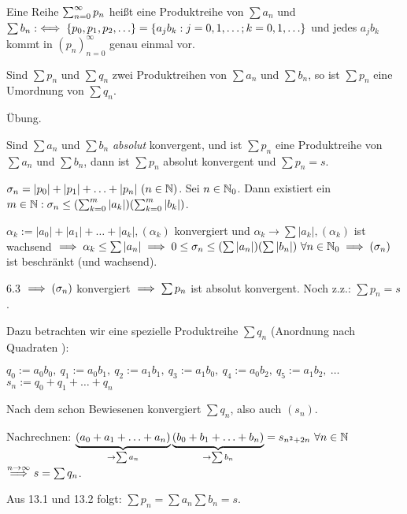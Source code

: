 \documentclass[a4paper,oneside,DIV15,BCOR12mm]{scrbook}
\begin{document}
\begin{definition}
Eine Reihe $\sum_{n=0}^{\infty}{p_n}$ heißt eine Produktreihe von $\sum{a_n}$ und $\sum{b_n} :\iff \{p_0,p_1,p_2,\ldots\} = \{a_j b_k: j=0,1,\ldots; k=0,1,\ldots\}$ und jedes $a_j b_k$ kommt in $(p_n)_{n=0}^{\infty}$ genau einmal vor.
\end{definition}

\begin{satz}
Sind $\sum{p_n}$ und $\sum{q_n}$ zwei Produktreihen von $\sum{a_n}$ und $\sum{b_n}$, so ist $\sum{p_n}$ eine Umordnung von $\sum{q_n}$.
\end{satz}

\begin{beweis}
Übung.
\end{beweis}

\begin{satz}
Sind $\sum{a_n}$ und $\sum{b_n}$ \emph{absolut} konvergent, und ist $\sum{p_n}$ eine Produktreihe von $\sum{a_n}$ und $\sum{b_n}$, dann ist $\sum{p_n}$ absolut konvergent und $\sum{p_n} = s$.
\end{satz}

\begin{beweis}
$\sigma_n = |p_0|+|p_1|+\ldots+|p_n|\ (n\in\MdN)$. Sei $n\in\mathbb{N}_0$. Dann existiert ein $m\in\mathbb{N}: \sigma_n \le (\sum_{k=0}^{m}{|a_k|})(\sum_{k=0}^{m}{|b_k|})$.

$\alpha_k := |a_0|+|a_1|+\ldots+|a_k|, (\alpha_k)$ konvergiert und $\alpha_k \to \sum{|a_k|}, (\alpha_k)$ ist wachsend $\implies \alpha_k \le \sum{|a_n|} \implies 0 \le \sigma_n \le (\sum{|a_n|})(\sum{|b_n|})\ \forall n\in\mathbb{N}_0 \implies (\sigma_n)$ ist beschränkt (und wachsend).

6.3 $\implies (\sigma_n)$ konvergiert $\implies \sum{p_n}$ ist absolut konvergent. Noch z.z.: $\sum{p_n} = s$.

Dazu betrachten wir eine spezielle Produktreihe $\sum{q_n}$ (\glqq Anordnung nach Quadraten \grqq):


$q_0 := a_0b_0,\ q_1 := a_0b_1,\ q_2 := a_1b_1,\ q_3 := a_1b_0,\ q_4 := a_0b_2,\ q_5 := a_1b_2,\ \ldots$ \\
$s_n := q_0+q_1+\ldots+q_n$

Nach dem schon Bewiesenen konvergiert $\sum{q_n}$, also auch $(s_n)$.

Nachrechnen: $\underbrace{(a_0+a_1+\ldots+a_n)}_{\to\sum{a_n}} \underbrace{(b_0+b_1+\ldots+b_n)}_{\to\sum{b_n}} = s_{n^2+2n}\ \forall n\in\mathbb{N}$\\
$\overset{n\to\infty}{\implies} s = \sum{q_n}$.

Aus 13.1 und 13.2 folgt: $\sum{p_n} = \sum{a_n} \sum{b_n} = s.$
\end{beweis}
\end{document}
